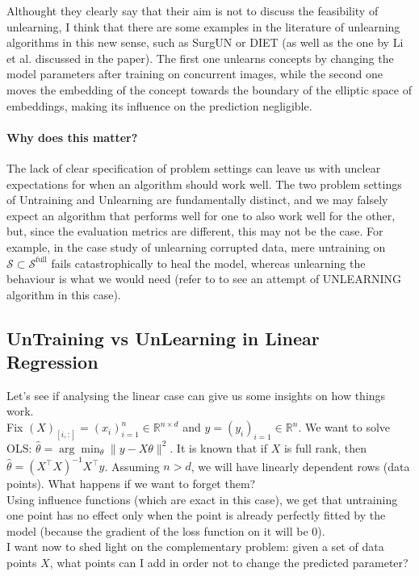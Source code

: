{Althought they clearly say that their aim is not to discuss the feasibility of unlearning, I think that there are some examples in the literature of unlearning algorithms in this new sense, such as SurgUN \cite{competition_forgetting_2026} or DIET \cite{diet_2026} (as well as the one by Li et al. discussed in the paper).
The first one unlearns concepts by changing the model parameters after training on concurrent images, while the second one moves the embedding of the concept towards the boundary of the elliptic space of embeddings, making its influence on the prediction negligible.

\paragraph{Why does this matter?} The lack of clear specification of problem settings can leave us with unclear expectations for when an algorithm should work well.
  The two problem settings of Untraining and Unlearning are fundamentally distinct, and we may falsely expect an algorithm that performs well for one to also work well for the other, but, since the evaluation metrics are different, this may not be the case.
  For example, in the case study of unlearning corrupted data, mere untraining on $\mathcal{S}\subset \mathcal{S}^{\mathrm{full}}$ fails catastrophically to heal the model, whereas unlearning the behaviour is what we would need (refer to \cite{schoepf_redirection_2026} to see an attempt of UNLEARNING algorithm in this case).


\subsection{UnTraining vs UnLearning in Linear Regression}
Let's see if analysing the linear case can give us some insights on how things work.\\
Fix $(X)_{[i,:]}=(x_i)_{i=1}^n\in\mathbb{R}^{n\times d}$ and $y=(y_i)_{i=1}\in\mathbb{R}^n$. 
We want to solve OLS: $\hat\theta = \arg\min_\theta \|y-X\theta\|^2$.
It is known that if $X$ is full rank, then $\hat\theta=(X^\top X)^{-1}X^\top y$.
Assuming $n>d$, we will have linearly dependent rows (data points). What happens if we want to forget them?\\
Using influence functions (which are exact in this case), we get that untraining one point has no effect only when the point is already perfectly fitted by the model (because the gradient of the loss function on it will be 0).
\\ \qst I want now to shed light on the complementary problem: given a set of data points $X$, what points can I add in order not to change the predicted parameter?

}
